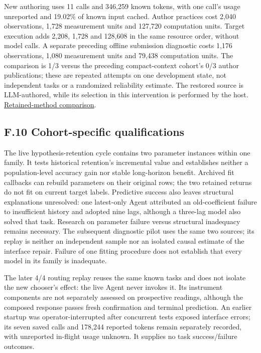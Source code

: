 \documentclass[twoside,11pt]{article}
\begin{document}
New authoring uses 11 calls and 346,259 known tokens, with one call's usage
unreported and 19.02\% of known input cached. Author practices cost 2,040
observations, 1,728 measurement units and 127,720 computation units. Target
execution adds 2,208, 1,728 and 128,608 in the same resource order, without model
calls. A separate preceding offline submission diagnostic costs 1,176
observations, 1,080 measurement units and 79,438 computation units. The comparison
is 1/3 versus the preceding compact-context cohort's 0/3 author publications;
these are repeated attempts on one development state, not independent tasks or
a randomized reliability estimate. The restored source is LLM-authored, while
its selection in this intervention is performed by the host.
\hyperlink{artifact-96}{Retained-method comparison}.


\subsection*{F.10 Cohort-specific qualifications}

The live hypothesis-retention cycle contains two parameter instances within one
family. It tests historical retention's incremental value and establishes neither
a population-level accuracy gain nor stable long-horizon benefit. Archived fit
callbacks can rebuild parameters on their original rows; the two retained returns
do not fit on current target labels. Predictive success also leaves structural
explanations unresolved: one latest-only Agent attributed an old-coefficient
failure to insufficient history and adopted nine lags, although a three-lag model
also solved that task. Research on parameter failure versus structural inadequacy
remains necessary. The subsequent diagnostic pilot uses the same two sources;
its replay is neither an independent sample nor an isolated causal estimate of
the interface repair. Failure of one fitting procedure does not establish that
every model in its family is inadequate.


The later 4/4 routing replay reuses the same known tasks and does not isolate the
new chooser's effect: the live Agent never invokes it. Its instrument components
are not separately assessed on prospective readings, although the composed
response passes fresh confirmation and terminal prediction. An earlier startup
was operator-interrupted after concurrent tests exposed interface errors; its
seven saved calls and 178,244 reported tokens remain separately recorded, with
unreported in-flight usage unknown. It supplies no task success/failure outcomes.
\end{document}
